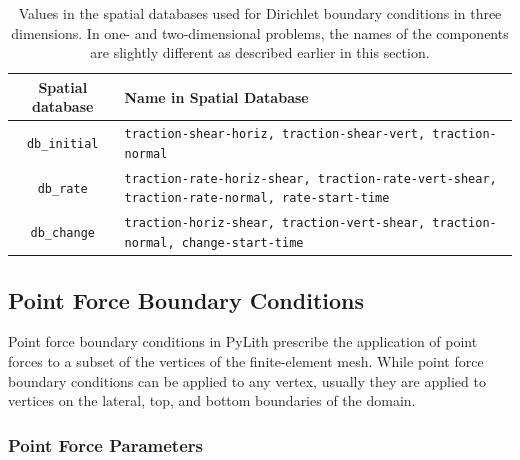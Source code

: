 \noindent \begin{center}
\begin{table}[H]
\noindent \centering{}\caption{Values in the spatial databases used for Dirichlet boundary conditions
in three dimensions. In one- and two-dimensional problems, the names
of the components are slightly different as described earlier in this
section.}
\medskip{}
\begin{tabular}{|c|>{\centering}p{4in}|}
\hline 
\textbf{Spatial database} & \textbf{Name in Spatial Database}\tabularnewline
\hline 
\hline 
\texttt{db\_initial} & \texttt{traction-shear-horiz, traction-shear-vert, traction-normal}\tabularnewline
\hline 
\texttt{db\_rate} & \texttt{traction-rate-horiz-shear, traction-rate-vert-shear, traction-rate-normal,
rate-start-time}\tabularnewline
\hline 
\texttt{db\_change} & \texttt{traction-horiz-shear, traction-vert-shear, traction-normal,
change-start-time}\tabularnewline
\hline 
\end{tabular}
\end{table}

\par\end{center}


\subsection{Point Force Boundary Conditions}

Point force boundary conditions in PyLith prescribe the application
of point forces to a subset of the vertices of the finite-element
mesh. While point force boundary conditions can be applied to any
vertex, usually they are applied to vertices on the lateral, top,
and bottom boundaries of the domain.


\subsubsection{Point Force Parameters}

